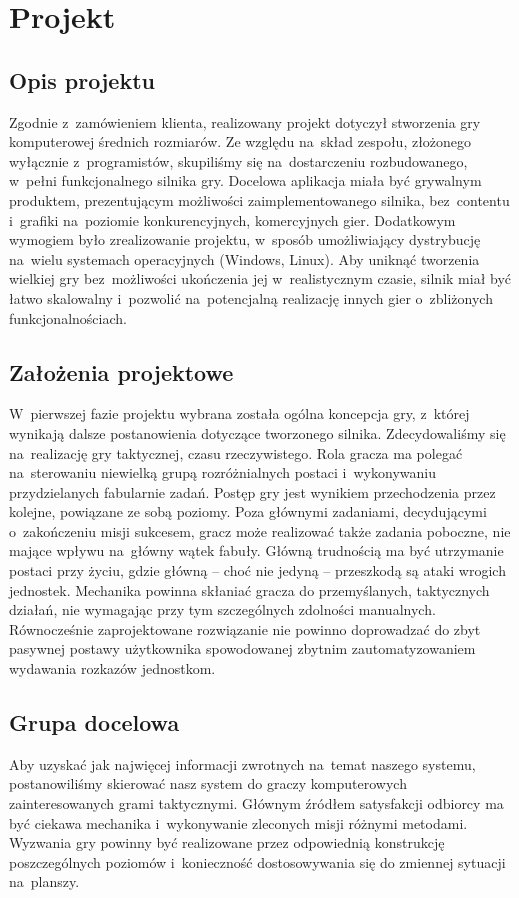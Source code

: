 \documentclass[licencjacka]{pracamgr}
\begin{document}
\chapter{Projekt}

  \section{Opis projektu}
    Zgodnie z~zamówieniem klienta, realizowany projekt dotyczył stworzenia gry komputerowej
    średnich rozmiarów. Ze względu na~skład zespołu, złożonego wyłącznie z~programistów, skupiliśmy się
    na~dostarczeniu rozbudowanego, w~pełni funkcjonalnego silnika gry.
    Docelowa aplikacja miała być grywalnym produktem, prezentującym możliwości zaimplementowanego silnika,
    bez~contentu i~grafiki na~poziomie konkurencyjnych, komercyjnych gier. Dodatkowym wymogiem było zrealizowanie
    projektu, w~sposób umożliwiający dystrybucję na~wielu systemach operacyjnych (Windows, Linux). Aby uniknąć
    tworzenia wielkiej gry bez~możliwości ukończenia jej w~realistycznym czasie, silnik miał być łatwo skalowalny
    i~pozwolić na~potencjalną realizację innych gier o~zbliżonych funkcjonalnościach.

  \section{Założenia projektowe}
    W~pierwszej fazie projektu wybrana została ogólna koncepcja gry, z~której wynikają dalsze postanowienia dotyczące
    tworzonego silnika. Zdecydowaliśmy się na~realizację gry taktycznej, czasu rzeczywistego. Rola gracza ma polegać
    na~sterowaniu niewielką grupą rozróżnialnych postaci i~wykonywaniu przydzielanych fabularnie zadań. Postęp gry jest 
    wynikiem przechodzenia przez kolejne, powiązane ze sobą poziomy. Poza głównymi zadaniami, decydującymi o~zakończeniu
    misji sukcesem, gracz może realizować także zadania poboczne, nie mające wpływu na~główny wątek fabuły. Główną
    trudnością ma być utrzymanie postaci przy życiu, gdzie główną -- choć nie jedyną -- przeszkodą są ataki wrogich jednostek.
    Mechanika powinna skłaniać gracza do przemyślanych, taktycznych działań, nie wymagając przy tym szczególnych zdolności manualnych.
    Równocześnie zaprojektowane rozwiązanie nie powinno doprowadzać do zbyt pasywnej postawy użytkownika spowodowanej zbytnim
    zautomatyzowaniem wydawania rozkazów jednostkom.

  \section{Grupa docelowa}
    Aby uzyskać jak najwięcej informacji zwrotnych na~temat naszego systemu, postanowiliśmy skierować nasz system do
    graczy komputerowych zainteresowanych grami taktycznymi. Głównym źródłem satysfakcji odbiorcy ma być ciekawa mechanika
    i~wykonywanie zleconych misji różnymi metodami. Wyzwania gry powinny być realizowane przez odpowiednią konstrukcję poszczególnych
    poziomów i~konieczność dostosowywania się do zmiennej sytuacji na~planszy.
\end{document}
